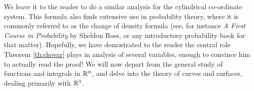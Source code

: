 \documentclass[../Analysis-3.tex]{subfiles}
\begin{document}
We leave it to the reader to do a similar analysis for the cylindrical co-ordinate system. This formula also finds extensive use in probability theory, where it is commonly referred to as the change of density formula (see, for instance \textit{A First Course in Probability} by Sheldon Ross, or any introductory probability book for that matter). Hopefully, we have demostrated to the reader the central role Theorem \ref{th:chovar} plays in analysis of several variables, enough to convince him to actually read the proof! We will now depart from the general study of functions and integrals in $\mathbb{R}^n$, and delve into the theory of curves and surfaces, dealing primarily with $\mathbb{R}^3$.
\end{document}
